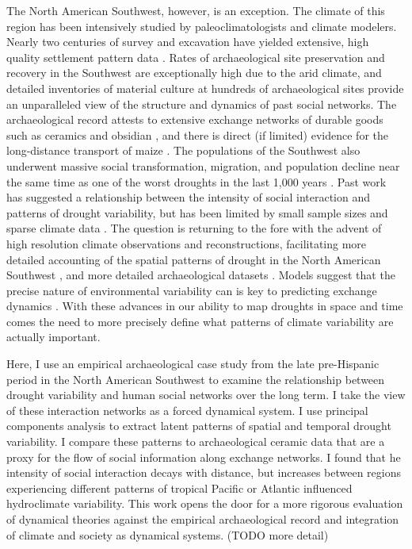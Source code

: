 \documentclass[10pt]{iopart}
\begin{document}
The North American Southwest, however, is an exception. The climate of this region has been intensively studied by paleoclimatologists and climate modelers. Nearly two centuries of survey and excavation have yielded extensive, high quality settlement pattern data \parencite{Hill2004}. Rates of archaeological site preservation and recovery in the Southwest are exceptionally high due to the arid climate, and detailed inventories of material culture at hundreds of archaeological sites provide an unparalleled view of the structure and dynamics of past social networks. The archaeological record attests to extensive exchange networks of durable goods such as ceramics and obsidian \parencite{Taliaferro2010,Mills2013a}, and there is direct (if limited) evidence for the long-distance transport of maize \parencite{Benson2009,Benson2010}. The populations of the Southwest also underwent massive social transformation, migration, and population decline near the same time as one of the worst droughts in the last 1,000 years \parencite{Hill2004}. Past work has suggested a relationship between the intensity of social interaction and patterns of drought variability, but has been limited by small sample sizes and sparse climate data \parencite{Rautman1993a,Johnson1990ChumashAnalysis,Cordell2007}. The question is returning to the fore with the advent of high resolution climate observations and reconstructions, facilitating more detailed accounting of the spatial patterns of drought in the North American Southwest \parencite{Strawhacker2017RiskProvince}, and more detailed archaeological datasets \parencite{Borck2015}. Models suggest that the precise nature of environmental variability can is key to predicting exchange dynamics \parencite{Freeman2014}. With these advances in our ability to map droughts in space and time comes the need to more precisely define what patterns of climate variability are actually important.

Here, I use an empirical archaeological case study from the late pre-Hispanic period in the North American Southwest to examine the relationship between drought variability and human social networks over the long term. I take the view of these interaction networks as a forced dynamical system. I use principal components analysis to extract latent patterns of spatial and temporal drought variability. I compare these patterns to archaeological ceramic data that are a proxy for the flow of social information along exchange networks. I found that he intensity of social interaction decays with distance, but increases between regions experiencing different patterns of tropical Pacific or Atlantic influenced hydroclimate variability. This work opens the door for a more rigorous evaluation of dynamical theories against the empirical archaeological record and integration of climate and society as dynamical systems. (TODO more detail)
\end{document}
